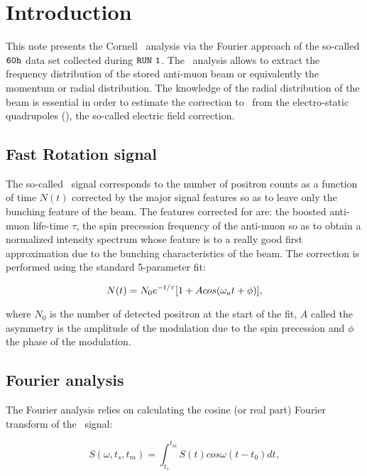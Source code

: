 \section{Introduction}

This note presents the Cornell \fr\ analysis via the Fourier approach of the so-called ${\tt 60h}$ data set collected during ${\tt RUN~1}$.
The \fr\ analysis allows to extract the frequency distribution of the stored anti-muon beam or equivalently the momentum or radial distribution.
The knowledge of the radial distribution of the beam is essential in order to estimate the correction to \wa\ from the electro-static quadrupoles (\esq),
the so-called electric field correction.

\subsection{Fast Rotation signal}

The so-called \fr\ signal corresponds to the number of positron counts as a function of time $N(t)$ corrected by the major signal
features so as to leave only the bunching feature of the beam. The features corrected for are: the boosted anti-muon life-time $\tau$,
the spin precession frequency of the anti-muon \wa\; so as to obtain a normalized intensity spectrum whose feature is to a
really good first approximation due to the bunching characteristics of the beam. The correction is performed using the standard
5-parameter fit:

\begin{equation}
        N(t) = N_{0}e^{-t/\tau}[1+Acos(\mbox{\ensuremath{\omega_a}} t + \phi)],
\end{equation}

where $N_{0}$ is the number of detected positron at the start of the fit, $A$ called the asymmetry is the amplitude of the
modulation due to the spin precession and $\phi$ the phase of the modulation.

\subsection{Fourier analysis}

The Fourier analysis relies on calculating the cosine (or real part) Fourier transform of the \fr\ signal:

\begin{equation}
    S(\omega,t_{s},t_{m}) = \int^{t_{m}}_{t_{s}} S(t) cos\omega(t-t_{0})dt,
\label{eq:cosine}
\end{equation}

